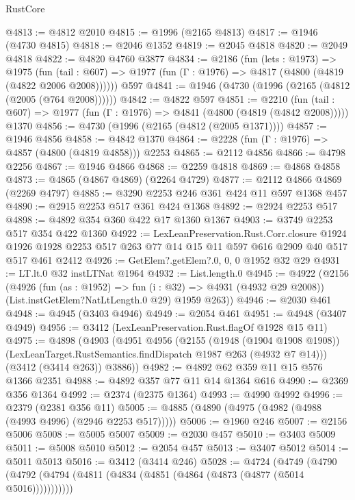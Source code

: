 \begin{lexlean}{RustCore}
\begin{coremodule}
@4813 := @4812 @2010
@4815 := @1996 (@2165 @4813)
@4817 := @1946 (@4730 @4815)
@4818 := @2046 @1352
@4819 := @2045 @4818
@4820 := @2049 @4818
@4822 := @4820 @4760 @3877
@4834 := @2186
    (fun (lets : @1973) =>
    @1975
      (fun (tail : @607) => @1977 (fun (Γ : @1976) => @4817 (@4800 (@4819 (@4822 @2006 @2008))))))
    @597
@4841 := @1946 (@4730 (@1996 (@2165 (@4812 (@2005 (@764 @2008))))))
@4842 := @4822 @597
@4851 := @2210
    (fun (tail : @607) => @1977 (fun (Γ : @1976) => @4841 (@4800 (@4819 (@4842 @2008)))))
    @1370
@4856 := @4730 (@1996 (@2165 (@4812 (@2005 @1371))))
@4857 := @1946 @4856
@4858 := @4842 @1370
@4864 := @2228 (fun (Γ : @1976) => @4857 (@4800 (@4819 @4858))) @2253
@4865 := @2112 @4856
@4866 := @4798 @2256
@4867 := @1946 @4866
@4868 := @2259 @4818
@4869 := @4868 @4858
@4873 := @4865 (@4867 @4869) (@2264 @4729)
@4877 := @2112 @4866 @4869 (@2269 @4797)
@4885 := @3290 @2253 @246 @361 @424 @11 @597 @1368 @457
@4890 := @2915 @2253 @517 @361 @424 @1368
@4892 := @2924 @2253 @517
@4898 := @4892 @354 @360 @422 @17 @1360 @1367
@4903 := @3749 @2253 @517 @354 @422 @1360
@4922 := LexLeanPreservation.Rust.Corr.closure
    @1924
    @1926
    @1928
    @2253
    @517
    @263
    @77
    @14
    @15
    @11
    @597
    @616
    @2909
    @40
    @517
    @517
    @461
    @2412
@4926 := GetElem?.getElem?.{0, 0, 0} @1952 @32 @29
@4931 := LT.lt.{0} @32 instLTNat @1964
@4932 := List.length.{0}
@4945 := @4922
    (@2156
      (@4926
        (fun (as : @1952) => fun (i : @32) => @4931 (@4932 @29 @2008))
        (List.instGetElem?NatLtLength.{0} @29)
        @1959
        @263))
@4946 := @2030 @461
@4948 := @4945 (@3403 @4946)
@4949 := @2054 @461
@4951 := @4948 (@3407 @4949)
@4956 := @3412 (LexLeanPreservation.Rust.flagOf @1928 @15 @11)
@4975 := @4898
    (@4903
      (@4951
        @4956
        (@2155
          (@1948 (@1904 @1908 @1908))
          (LexLeanTarget.RustSemantics.findDispatch @1987 @263 (@4932 @7 @14)))
        (@3412 (@3414 @263))
        @3886))
@4982 := @4892 @62 @359 @11 @15 @576 @1366 @2351
@4988 := @4892 @357 @77 @11 @14 @1364 @616
@4990 := @2369 @356 @1364
@4992 := @2374 (@2375 @1364)
@4993 := @4990 @4992
@4996 := @2379 (@2381 @356 @11)
@5005 := @4885 (@4890 (@4975 (@4982 (@4988 (@4993 @4996) (@2946 @2253 @517)))))
@5006 := @1960 @246
@5007 := @2156 @5006
@5008 := @5005 @5007
@5009 := @2030 @457
@5010 := @3403 @5009
@5011 := @5008 @5010
@5012 := @2054 @457
@5013 := @3407 @5012
@5014 := @5011 @5013
@5016 := @3412 (@3414 @246)
@5028 := @4724
    (@4749 (@4790 (@4792 (@4794 (@4811 (@4834 (@4851 (@4864 (@4873 (@4877 (@5014 @5016)))))))))))

\end{coremodule}
\end{lexlean}
